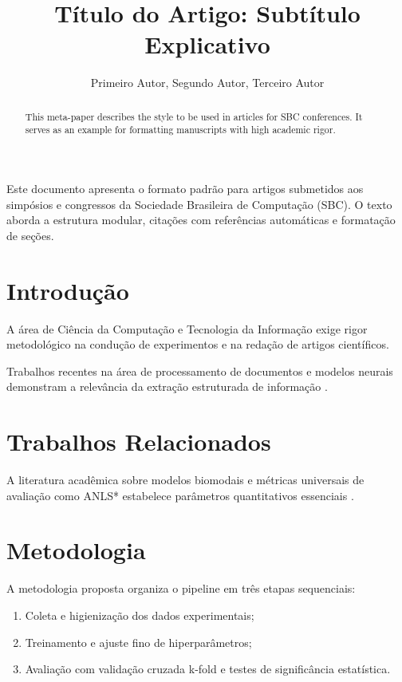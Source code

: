 \documentclass[12pt]{article}
\title{Título do Artigo: Subtítulo Explicativo}
\author{Primeiro Autor\inst{1}, Segundo Autor\inst{1,2}, Terceiro Autor\inst{2}}
\begin{document}
\maketitle

\begin{abstract}
This meta-paper describes the style to be used in articles for SBC conferences.
It serves as an example for formatting manuscripts with high academic rigor.
\end{abstract}

\begin{resumo}
Este documento apresenta o formato padrão para artigos submetidos aos simpósios e congressos da Sociedade Brasileira de Computação (SBC). O texto aborda a estrutura modular, citações com referências automáticas e formatação de seções.
\end{resumo}

\section{Introdução}
A área de Ciência da Computação e Tecnologia da Informação exige rigor metodológico na condução de experimentos e na redação de artigos científicos.

Trabalhos recentes na área de processamento de documentos e modelos neurais demonstram a relevância da extração estruturada de informação \cite{Chai2024_X7HSG9C2}.

\section{Trabalhos Relacionados}
A literatura acadêmica sobre modelos biomodais e métricas universais de avaliação como ANLS* estabelece parâmetros quantitativos essenciais \cite{Peer2024_W5J79WT6}.

\section{Metodologia}
A metodologia proposta organiza o pipeline em três etapas sequenciais:
\begin{enumerate}
    \item Coleta e higienização dos dados experimentais;
    \item Treinamento e ajuste fino de hiperparâmetros;
    \item Avaliação com validação cruzada k-fold e testes de significância estatística.
\end{enumerate}
\end{document}
